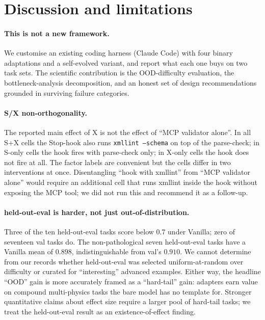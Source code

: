 \documentclass{article}
\begin{document}
\section{Discussion and limitations}
\label{sec:discussion}
\label{subsec:limitations}

\paragraph{This is not a new framework.}
We customise an existing coding harness (Claude Code) with four binary adaptations and a self-evolved variant, and report what each one buys on two task sets. The scientific contribution is the OOD-difficulty evaluation, the bottleneck-analysis decomposition, and an honest set of design recommendations grounded in surviving failure categories.

\paragraph{S/X non-orthogonality.}
The reported main effect of $\mathrm{X}$ is not the effect of ``MCP validator alone''. In all S+X cells the Stop-hook also runs \texttt{xmllint --schema} on top of the parse-check; in S-only cells the hook fires with parse-check only; in X-only cells the hook does not fire at all. The factor labels are convenient but the cells differ in two interventions at once. Disentangling ``hook with xmllint'' from ``MCP validator alone'' would require an additional cell that runs xmllint inside the hook without exposing the MCP tool; we did not run this and recommend it as a follow-up.

\paragraph{held-out-eval is harder, not just out-of-distribution.}
Three of the ten held-out-eval tasks score below 0.7 under Vanilla; zero of seventeen val tasks do. The non-pathological seven held-out-eval tasks have a Vanilla mean of $0.898$, indistinguishable from val's $0.910$. We cannot determine from our records whether held-out-eval was selected uniform-at-random over difficulty or curated for ``interesting'' advanced examples. Either way, the headline ``OOD'' gain is more accurately framed as a ``hard-tail'' gain: adapters earn value on compound multi-physics tasks the bare model has no template for. Stronger quantitative claims about effect size require a larger pool of hard-tail tasks; we treat the held-out-eval result as an existence-of-effect finding.
\end{document}
